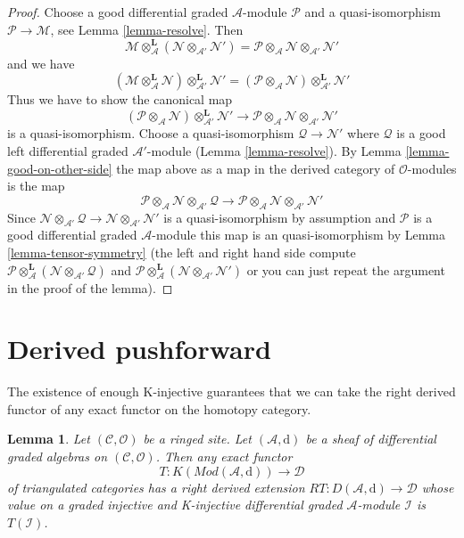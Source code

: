 \documentclass{stacks-project}
\theoremstyle{plain}
\newtheorem{lemma}[subsection]{Lemma}
\theoremstyle{definition}
\theoremstyle{remark}
\numberwithin{equation}{subsection}
\begin{document}
\begin{proof}
Choose a good differential graded $\mathcal{A}$-module
$\mathcal{P}$ and a quasi-isomorphism $\mathcal{P} \to \mathcal{M}$, see
Lemma \ref{lemma-resolve}. Then
$$
\mathcal{M}
\otimes_\mathcal{A}^\mathbf{L}
(\mathcal{N} \otimes_{\mathcal{A}'} \mathcal{N}') =
\mathcal{P} \otimes_\mathcal{A} \mathcal{N}
\otimes_{\mathcal{A}'} \mathcal{N}'
$$
and we have
$$
(\mathcal{M}
\otimes_\mathcal{A}^\mathbf{L} \mathcal{N})
\otimes_{\mathcal{A}'}^\mathbf{L} \mathcal{N}' =
(\mathcal{P} \otimes_\mathcal{A} \mathcal{N})
\otimes_{\mathcal{A}'}^\mathbf{L} \mathcal{N}'
$$
Thus we have to show the canonical map
$$
(\mathcal{P} \otimes_\mathcal{A} \mathcal{N})
\otimes_{\mathcal{A}'}^\mathbf{L} \mathcal{N}'
\longrightarrow
\mathcal{P} \otimes_\mathcal{A} \mathcal{N}
\otimes_{\mathcal{A}'} \mathcal{N}'
$$
is a quasi-isomorphism. Choose a quasi-isomorphism
$\mathcal{Q} \to \mathcal{N}'$ where $\mathcal{Q}$
is a good left differential graded $\mathcal{A}'$-module
(Lemma \ref{lemma-resolve}).
By Lemma \ref{lemma-good-on-other-side} the map
above as a map in the derived category of $\mathcal{O}$-modules is the map
$$
\mathcal{P} \otimes_\mathcal{A} \mathcal{N}
\otimes_{\mathcal{A}'} \mathcal{Q}
\longrightarrow
\mathcal{P} \otimes_\mathcal{A} \mathcal{N}
\otimes_{\mathcal{A}'} \mathcal{N}'
$$
Since $\mathcal{N} \otimes_{\mathcal{A}'} \mathcal{Q} \to
\mathcal{N} \otimes_{\mathcal{A}'} \mathcal{N}'$ is a quasi-isomorphism
by assumption and $\mathcal{P}$ is a good differential graded
$\mathcal{A}$-module this map is an quasi-isomorphism by
Lemma \ref{lemma-tensor-symmetry} (the left and right hand side
compute $\mathcal{P} \otimes_\mathcal{A}^\mathbf{L} (\mathcal{N}
\otimes_{\mathcal{A}'} \mathcal{Q})$ and
$\mathcal{P} \otimes_\mathcal{A}^\mathbf{L} (\mathcal{N}
\otimes_{\mathcal{A}'} \mathcal{N}')$ or you can just repeat
the argument in the proof of the lemma).
\end{proof}






\section{Derived pushforward}
\label{section-derived-pushforward}

\noindent
The existence of enough K-injective guarantees that we can take the right
derived functor of any exact functor on the homotopy category.

\begin{lemma}
\label{lemma-right-derived}
Let $(\mathcal{C}, \mathcal{O})$ be a ringed site.
Let $(\mathcal{A}, \text{d})$ be a sheaf of differential graded algebras on
$(\mathcal{C}, \mathcal{O})$. Then any exact functor
$$
T : K(\textit{Mod}(\mathcal{A}, \text{d})) \longrightarrow \mathcal{D}
$$
of triangulated categories has a right derived extension
$RT : D(\mathcal{A}, \text{d}) \to \mathcal{D}$
whose value on a graded injective and K-injective
differential graded $\mathcal{A}$-module $\mathcal{I}$
is $T(\mathcal{I})$.
\end{lemma}
\end{document}
